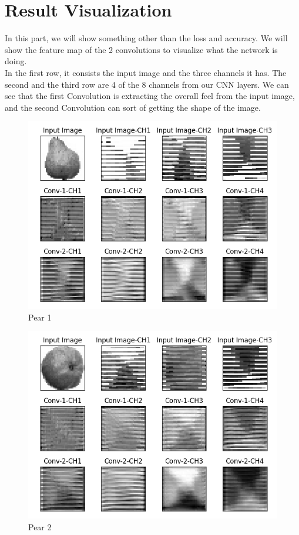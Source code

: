 \documentclass[a4paper, 10]{article}
\begin{document}
\section{Result Visualization}
    In this part, we will show something other than the loss and accuracy.
    We will show the feature map of the 2 convolutions to visualize
    what the network is doing.\\
    \indent In the first row, it consists the input image and the 
    three channels it has. The second and the third row are
    4 of the 8 channels from our CNN layers. We can see that
    the first Convolution is extracting the overall feel from
    the input image, and the second Convolution can sort of getting
    the shape of the image.
    \begin{figure}[H]
        \centering
        \includegraphics[width=\textwidth]{Pear.png}
        \caption{Pear 1} \label{fig:4}
    \end{figure}
    \begin{figure}[H]
        \centering
        \includegraphics[width=\textwidth]{Pear1.png}
        \caption{Pear 2} \label{fig:5}
    \end{figure}
\end{document}
